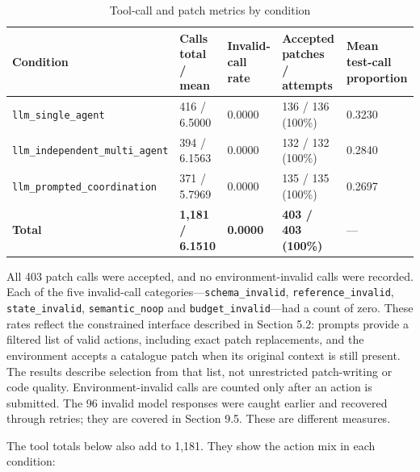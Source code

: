 \documentclass[12pt,a4paper,oneside]{report}
\begin{document}
\begin{table}[htbp]
\centering
\small
\setlength{\tabcolsep}{4pt}
\begin{tabularx}{\linewidth}{|Y|Y|Y|Y|Y|}
\hline
\textbf{Condition} & \textbf{Calls total / mean} & \textbf{Invalid-call rate} & \textbf{Accepted patches / attempts} & \textbf{Mean test-call proportion} \\
\hline
\texttt{llm\allowbreak\_single\allowbreak\_agent} & 416 / 6.5000 & 0.0000 & 136 / 136 (100\%) & 0.3230 \\
\hline
\texttt{llm\allowbreak\_independent\allowbreak\_multi\allowbreak\_agent} & 394 / 6.1563 & 0.0000 & 132 / 132 (100\%) & 0.2840 \\
\hline
\texttt{llm\allowbreak\_prompted\allowbreak\_coordination} & 371 / 5.7969 & 0.0000 & 135 / 135 (100\%) & 0.2697 \\
\hline
\textbf{Total} & \textbf{1,181 / 6.1510} & \textbf{0.0000} & \textbf{403 / 403 (100\%)} & — \\
\hline
\end{tabularx}
\caption{Tool-call and patch metrics by condition}
\end{table}
All 403 patch calls were accepted, and no environment-invalid calls were recorded. Each of the five invalid-call categories—\texttt{schema\allowbreak\_invalid}, \texttt{reference\allowbreak\_invalid}, \texttt{state\allowbreak\_invalid}, \texttt{semantic\allowbreak\_noop} and \texttt{budget\allowbreak\_invalid}—had a count of zero. These rates reflect the constrained interface described in Section 5.2: prompts provide a filtered list of valid actions, including exact patch replacements, and the environment accepts a catalogue patch when its original context is still present. The results describe selection from that list, not unrestricted patch-writing or code quality. Environment-invalid calls are counted only after an action is submitted. The 96 invalid model responses were caught earlier and recovered through retries; they are covered in Section 9.5. These are different measures.

The tool totals below also add to 1,181. They show the action mix in each condition:
\end{document}
